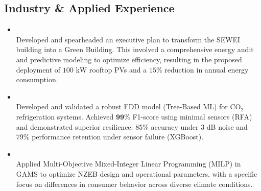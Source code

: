 \documentclass[letter,20pt]{article}
\begin{document}
\subsection*{\fontsize{10pt}{12pt}\selectfont Industry \& Applied Experience}
\begin{itemize}[noitemsep, topsep=6pt, after=\vspace{-0.5 mm}, leftmargin = 2ex, rightmargin=1ex]
    
    \small\item[]\\
    Developed and spearheaded an executive plan to transform the SEWEI building into a Green Building. This involved a comprehensive energy audit and predictive modeling to optimize efficiency, resulting in the proposed deployment of $100\text{ kW}$ rooftop PVs and a $15\%$ reduction in annual energy consumption.
    \vspace{0.5em}

    \small\item[]\\
    Developed and validated a robust FDD model (Tree-Based ML) for $\text{CO}_2$ refrigeration systems. Achieved $\mathbf{99\%}$ F1-score using minimal sensors (RFA) and demonstrated superior resilience: $85\%$ accuracy under 3 dB noise and $79\%$ performance retention under sensor failure (XGBoost).
    \vspace{0.5em}
    
    \small\item[]\\
    Applied Multi-Objective Mixed-Integer Linear Programming (MILP) in GAMS to optimize NZEB design and operational parameters, with a specific focus on differences in consumer behavior across diverse climate conditions.
    \vspace{-0.5em}
    
\end{itemize}
\end{document}
